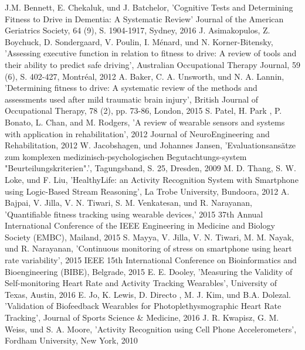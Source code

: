 \documentclass[conference]{IEEEtran}
\begin{document}
\begin{thebibliography}{00}
J.M. Bennett, E. Chekaluk, und J. Batchelor,
'Cognitive Tests and Determining Fitness to Drive in Dementia: A Systematic Review'
Journal of the American Geriatrics Society, 64 (9), S. 1904-1917, Sydney, 2016
J. Asimakopulos, Z. Boychuck, D. Sondergaard, V. Poulin, I. Ménard, und N. Korner-Bitensky, 'Assessing executive function in relation to fitness to drive: A review of tools and their ability to predict safe driving', Australian Occupational Therapy Journal, 59 (6), S. 402-427, Montréal, 2012
A. Baker, C. A. Unsworth, und N. A. Lannin,
'Determining fitness to drive: A systematic review of the methods and assessments used after mild traumatic brain injury', British Journal of Occupational Therapy, 78 (2), pp. 73-86, London, 2015
 S. Patel, H. Park
, P. Bonato, L. Chan, and M. Rodgers, 'A review of wearable sensors and systems with application in rehabilitation', 2012 Journal of NeuroEngineering and Rehabilitation, 2012
 W. Jacobshagen, und Johannes Jansen, 'Evaluationsansätze zum komplexen medizinisch-psychologischen Begutachtungs-system "Beurteilungskriterien".', Tagungsband, S. 25, Dresden, 2009
 M. D. Thang, S. W. Loke, und F. Liu, 'HealthyLife: an Activity Recognition System with Smartphone using Logic-Based Stream Reasoning',  La Trobe University, Bundoora, 2012
  A. Bajpai, V. Jilla, V. N. Tiwari, S. M. Venkatesan, und R. Narayanan, 'Quantifiable fitness tracking using wearable devices,' 2015 37th Annual International Conference of the IEEE Engineering in Medicine and Biology Society (EMBC), Mailand, 2015
 S. Mayya, V. Jilla, V. N. Tiwari, M. M. Nayak, und R. Narayanan, 'Continuous monitoring of stress on smartphone using heart rate variability', 2015 IEEE 15th International Conference on Bioinformatics and Bioengineering (BIBE), Belgrade, 2015
 E. E. Dooley, 'Measuring the Validity of Self-monitoring Heart Rate and Activity Tracking Wearables', University of Texas, Austin, 2016
 E. Jo, K. Lewis, D. Directo , M. J.  Kim, und B.A. Dolezal. 'Validation of Biofeedback Wearables for Photoplethysmographic Heart Rate Tracking', Journal of Sports Science \& Medicine, 2016
 J. R. Kwapisz, G. M. Weiss, und S. A. Moore, 'Activity Recognition using Cell Phone Accelerometers', Fordham University, New York, 2010

\end{thebibliography}
\end{document}
